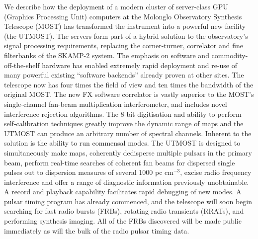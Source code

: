 We describe how the deployment of a modern cluster of server-class GPU (Graphics Processing Unit) computers at the Molonglo Observatory Synthesis Telescope (MOST) has transformed the instrument into a powerful new facility (the UTMOST). The servers form part of a hybrid solution to the observatory's signal processing requirements, replacing the corner-turner, correlator and fine filterbanks of the SKAMP-2 system. The emphasis on software and commodity-off-the-shelf hardware has enabled extremely rapid deployment and re-use of many powerful existing ``software backends'' already proven at other sites. The telescope now has four times the field of view and ten times the bandwidth of the original MOST. The new FX software correlator is vastly superior to the MOST's single-channel fan-beam multiplication interferometer, and includes novel interference rejection algorithms. The 8-bit digitisation and ability to perform self-calibration techniques greatly improve the dynamic range of maps and the UTMOST can produce an arbitrary number of spectral channels. Inherent to the solution is the ability to run commensal modes. The UTMOST is designed to simultaneously make maps, coherently dedisperse multiple pulsars in the primary beam, perform real-time searches of coherent fan beams for dispersed single pulses out to dispersion measures of several 1000 pc cm$^{-3}$, excise radio frequency interference and offer a range of diagnostic information previously unobtainable. A record and playback capability facilitates rapid debugging of new modes. A pulsar timing program has already commenced, and the telescope will soon begin searching for fast radio bursts (FRBs), rotating radio transients (RRATs), and performing synthesis imaging. All of the FRBs discovered will be made public immediately as will the bulk of the radio pulsar timing data. 
